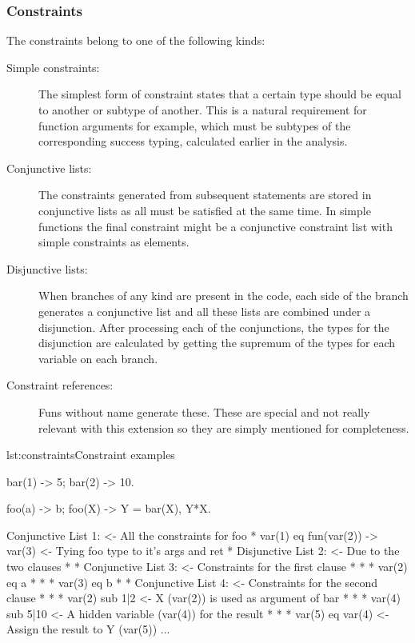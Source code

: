 \subsubsection{Constraints}
\label{sct:orig_constraints}

The constraints belong to one of the following kinds:
\begin{description}
\item[Simple constraints:] The simplest form of constraint states that
  a certain type should be equal to another or subtype of
  another. This is a natural requirement for function arguments for
  example, which must be subtypes of the corresponding success typing,
  calculated earlier in the analysis.
\item[Conjunctive lists:] The constraints generated from subsequent
  statements are stored in conjunctive lists as all must be satisfied
  at the same time. In simple functions the final constraint might be
  a conjunctive constraint list with simple constraints as elements.
\item[Disjunctive lists:] When branches of any kind are present in the
  code, each side of the branch generates a conjunctive list and all
  these lists are combined under a disjunction. After processing each
  of the conjunctions, the types for the disjunction are calculated by
  getting the supremum of the types for each variable on each branch.
\item[Constraint references:] Funs without name generate these. These
  are special and not really relevant with this extension so they are
  simply mentioned for completeness.
\end{description}

\begin{console}{lst:constraints}{Constraint examples}

bar(1) -> 5;
bar(2) -> 10.

foo(a) -> b;
foo(X) ->
  Y = bar(X),
  Y*X.


Conjunctive List 1:                <- All the constraints for foo
 * var(1) eq fun(var(2)) -> var(3) <- Tying foo type to it's args and ret
 * Disjunctive List 2:             <- Due to the two clauses
 *  * Conjunctive List 3:          <- Constraints for the first clause
 *  *  * var(2) eq a
 *  *  * var(3) eq b
 *  * Conjunctive List 4:          <- Constraints for the second clause
 *  *  * var(2) sub 1|2            <- X (var(2)) is used as argument of bar
 *  *  * var(4) sub 5|10           <- A hidden variable (var(4)) for the result
 *  *  * var(5) eq var(4)          <- Assign the result to Y (var(5))
 ...
\end{console}


